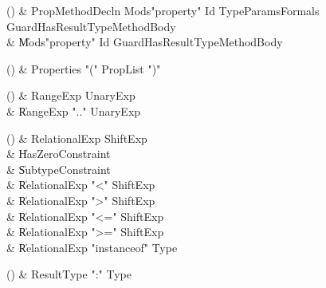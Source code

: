 \begin{bbgrammarappendix}{3.3in}

() & PropMethodDecln \label{prod:PropMethodDecln}  \: Mods\opt \xcd"property" Id TypeParams\opt Formals Guard\opt HasResultType\opt MethodBody  \\

 &    \|  Mods\opt \xcd"property" Id Guard\opt HasResultType\opt MethodBody \\

\end{bbgrammarappendix}

\begin{bbgrammarappendix}{4.0in}

() & Properties \label{prod:Properties}  \: \xcd"(" PropList \xcd")"  \\


\end{bbgrammarappendix}

\begin{bbgrammarappendix}{4.2in}

() & RangeExp \label{prod:RangeExp}  \: UnaryExp  \\

 &    \| RangeExp  \xcd".." UnaryExp  \\

\end{bbgrammarappendix}

\begin{bbgrammarappendix}{3.7in}

() & RelationalExp \label{prod:RelationalExp}  \: ShiftExp  \\

 &    \| HasZeroConstraint \\
 &    \| SubtypeConstraint \\
 &    \| RelationalExp \xcd"<" ShiftExp \\
 &    \| RelationalExp \xcd">" ShiftExp \\
 &    \| RelationalExp \xcd"<=" ShiftExp \\
 &    \| RelationalExp \xcd">=" ShiftExp \\
 &    \| RelationalExp \xcd"instanceof" Type \\

\end{bbgrammarappendix}

\begin{bbgrammarappendix}{4.0in}

() & ResultType \label{prod:ResultType}  \: \xcd":" Type  \\


\end{bbgrammarappendix}

